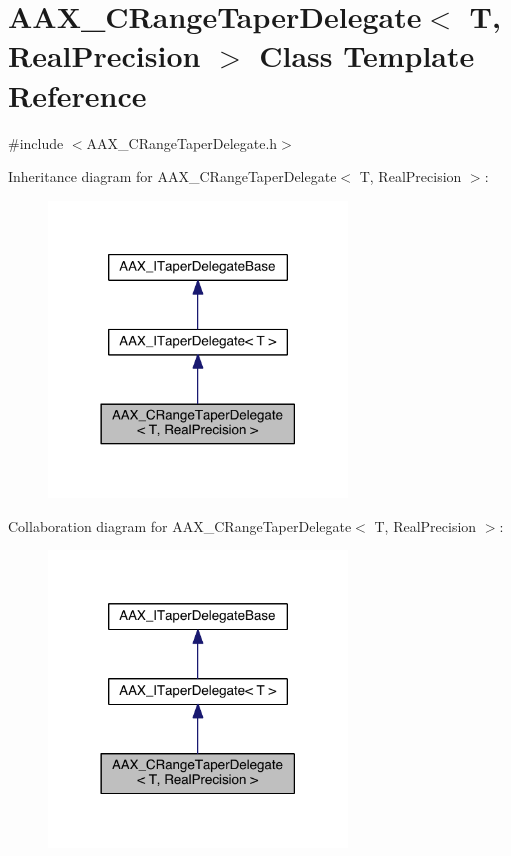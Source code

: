 \hypertarget{a00038}{}\section{A\+A\+X\+\_\+\+C\+Range\+Taper\+Delegate$<$ T, Real\+Precision $>$ Class Template Reference}
\label{a00038}


{\ttfamily \#include $<$A\+A\+X\+\_\+\+C\+Range\+Taper\+Delegate.\+h$>$}



Inheritance diagram for A\+A\+X\+\_\+\+C\+Range\+Taper\+Delegate$<$ T, Real\+Precision $>$\+:
\nopagebreak
\begin{figure}[H]
\begin{center}
\leavevmode
\includegraphics[width=225pt]{a00461}
\end{center}
\end{figure}


Collaboration diagram for A\+A\+X\+\_\+\+C\+Range\+Taper\+Delegate$<$ T, Real\+Precision $>$\+:
\nopagebreak
\begin{figure}[H]
\begin{center}
\leavevmode
\includegraphics[width=225pt]{a00462}
\end{center}
\end{figure}


